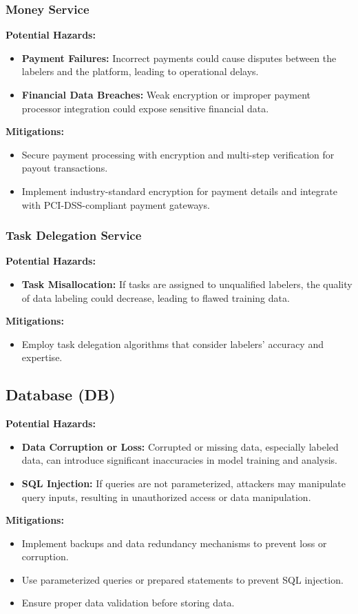 \documentclass{article}
\begin{document}
\subsubsection{Money Service}
\textbf{Potential Hazards:}
\begin{itemize}
    \item \textbf{Payment Failures:} Incorrect payments could cause disputes between the labelers and the platform, leading to operational delays.
    \item \textbf{Financial Data Breaches:} Weak encryption or improper payment processor integration could expose sensitive financial data.
\end{itemize}
\textbf{Mitigations:}
\begin{itemize}
    \item Secure payment processing with encryption and multi-step verification for payout transactions.
    \item Implement industry-standard encryption for payment details and integrate with PCI-DSS-compliant payment gateways.
\end{itemize}

\subsubsection{Task Delegation Service}
\textbf{Potential Hazards:}
\begin{itemize}
    \item \textbf{Task Misallocation:} If tasks are assigned to unqualified labelers, the quality of data labeling could decrease, leading to flawed training data.
\end{itemize}
\textbf{Mitigations:}
\begin{itemize}
    \item Employ task delegation algorithms that consider labelers’ accuracy and expertise.
\end{itemize}

\subsection{Database (DB)}
\textbf{Potential Hazards:}
\begin{itemize}
    \item \textbf{Data Corruption or Loss:} Corrupted or missing data, especially labeled data, can introduce significant inaccuracies in model training and analysis.
    \item \textbf{SQL Injection:} If queries are not parameterized, attackers may manipulate query inputs, resulting in unauthorized access or data manipulation.
\end{itemize}
\textbf{Mitigations:}
\begin{itemize}
    \item Implement backups and data redundancy mechanisms to prevent loss or corruption.
    \item Use parameterized queries or prepared statements to prevent SQL injection.
    \item Ensure proper data validation before storing data.
\end{itemize}
\end{document}
